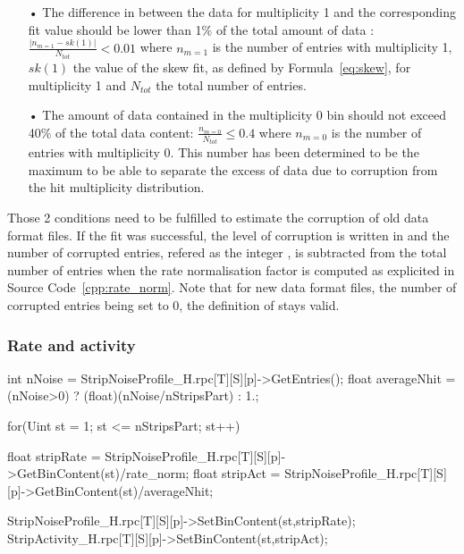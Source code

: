 	\begin{itemize}
		\item[•] The difference in between the data for multiplicity 1 and the corresponding fit value should be lower than 1\% of the total amount of data : $\frac{\vert n_{m=1} - sk(1)\vert}{N_{tot}} < 0.01$ where $n_{m=1}$ is the number of entries with multiplicity 1, $sk(1)$ the value of the skew fit, as defined by Formula~\ref{eq:skew}, for multiplicity 1 and $N_{tot}$ the total number of entries.
		\item[•] The amount of data contained in the multiplicity 0 bin should not exceed 40\% of the total data content: $\frac{n_{m=0}}{N_{tot}} \leq 0.4$ where $n_{m=0}$ is the number of entries with multiplicity 0. This number has been determined to be the maximum to be able to separate the excess of data due to corruption from the hit multiplicity distribution.
	\end{itemize}
	
	Those 2 conditions need to be fulfilled to estimate the corruption of old data format files. If the fit was successful, the  level of corruption is written in  and the number of corrupted entries, refered as the integer , is subtracted from the total number of entries when the rate normalisation factor is computed as explicited in Source Code~\ref{cpp:rate_norm}. Note that for new data format files, the number of corrupted entries being set to 0, the definition of  stays valid.
	
		\subsubsection{Rate and activity}
		\label{app2:sssec:rateact}
	
	\begin{code}
	\begin{cppcode}
int nNoise = StripNoiseProfile_H.rpc[T][S][p]->GetEntries();	
float averageNhit = (nNoise>0) ? (float)(nNoise/nStripsPart) : 1.;

for(Uint st = 1; st <= nStripsPart; st++){
	float stripRate =
		StripNoiseProfile_H.rpc[T][S][p]->GetBinContent(st)/rate_norm;
	float stripAct =
		StripNoiseProfile_H.rpc[T][S][p]->GetBinContent(st)/averageNhit;

	StripNoiseProfile_H.rpc[T][S][p]->SetBinContent(st,stripRate);
	StripActivity_H.rpc[T][S][p]->SetBinContent(st,stripAct);
}
	\end{cppcode}
	\label{cpp:striprateact}
	\vspace{5mm}
	\end{code}
		
